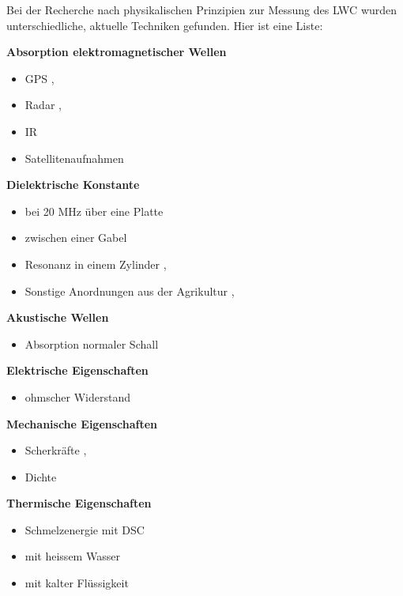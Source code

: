Bei der Recherche nach physikalischen Prinzipien zur Messung des LWC wurden unterschiedliche, aktuelle Techniken gefunden. Hier ist eine Liste:

\textbf{Absorption elektromagnetischer Wellen}
\begin{itemize}
\item GPS \cite{Koch.2019}, \cite{Koch.2014}
\item Radar \cite{Bonnell.2021}, \cite{ilmsens-short-range-radar}
\item IR \cite{Donahue.2022}
\item Satellitenaufnahmen \cite{Tsang.2022}

\end{itemize}

\textbf{Dielektrische Konstante}
\begin{itemize}
\item bei 20 MHz über eine Platte \cite{slf}
\item zwischen einer Gabel \cite{fork}
\item Resonanz in einem Zylinder \cite{a2photonicsensors}, \cite{nasa-snowex-2020}
\item Sonstige Anordnungen aus der Agrikultur \cite{Mavrovic.2020}, \cite{PerezDiaz.2017}
\end{itemize}

\textbf{Akustische Wellen}
\begin{itemize}
\item Absorption normaler Schall \cite{Kinar.2007}
\end{itemize}


\textbf{Elektrische Eigenschaften}
\begin{itemize}
\item ohmscher Widerstand \cite{Abdelaal.2022}
\end{itemize}

\textbf{Mechanische Eigenschaften}
\begin{itemize}
\item Scherkräfte \cite{Hao.2021}, \cite{jstage-snow-density}
\item Dichte \cite{nasa-snow-density}

\end{itemize}

\textbf{Thermische Eigenschaften}
\begin{itemize}
\item Schmelzenergie mit DSC \cite{mt-density-meter}
\item mit heissem Wasser \cite{Fasani.2023}
\item mit kalter Flüssigkeit

\end{itemize}

